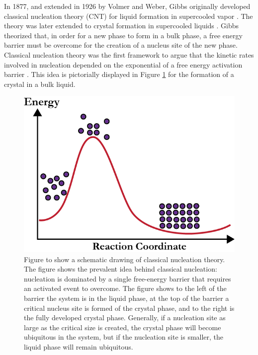 In 1877, and extended in 1926 by Volmer and Weber, Gibbs originally developed classical nucleation theory (CNT) for liquid formation in supercooled vapor \cite{debenedetti1996metastable}.  The theory was later extended to crystal formation in supercooled liquids \cite{debenedetti1996metastable}.  Gibbs theorized that, in order for a new phase to form in a bulk phase, a free energy barrier must be overcome for the creation of a nucleus site of the new phase.  Classical nucleation theory was the first framework to argue that the kinetic rates involved in nucleation depended on the exponential of a free energy activation barrier \cite{debenedetti1996metastable}.  This idea is pictorially displayed in Figure \ref{CNT} for the formation of a crystal in a bulk liquid.  

\begin{figure}[h]
	\centering
	\includegraphics[width = .5\textwidth]{./Figures/CNT/nucleation.png}
	\caption[Figure to show a schematic drawing of classical nucleation theory.  The figure shows the prevalent idea behind classical nucleation: nucleation is dominated by a single free-energy barrier that requires an activated event to overcome.  The figure shows to the left of the barrier the system is in the liquid phase, at the top of the barrier a critical nucleus site is formed of the crystal phase, and to the right is the fully developed crystal phase.  Generally, if a nucleation site as large as the critical size is created, the crystal phase will become ubiquitous in the system, but if the nucleation site is smaller, the liquid phase will remain ubiquitous.]{Figure to show a schematic drawing of classical nucleation theory.  The figure shows the prevalent idea behind classical nucleation: nucleation is dominated by a single free-energy barrier that requires an activated event to overcome.  The figure shows to the left of the barrier the system is in the liquid phase, at the top of the barrier a critical nucleus site is formed of the crystal phase, and to the right is the fully developed crystal phase.  Generally, if a nucleation site as large as the critical size is created, the crystal phase will become ubiquitous in the system, but if the nucleation site is smaller, the liquid phase will remain ubiquitous. \cite{debenedetti1996metastable}}
	\label{CNT}
\end{figure}

